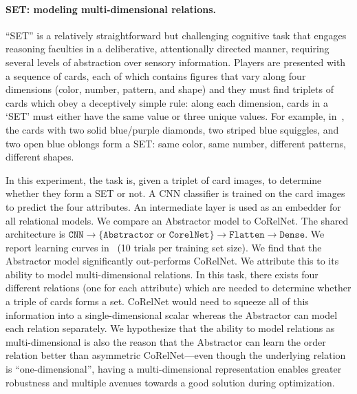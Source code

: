 \paragraph{SET: modeling multi-dimensional relations.}
``SET'' is a relatively straightforward but challenging cognitive task that engages reasoning faculties in a deliberative, attentionally directed manner, requiring several levels of abstraction over sensory information. Players are presented with a sequence of cards, each of which contains figures that vary along four dimensions (color, number, pattern, and shape) and they must find triplets of cards which obey a deceptively simple rule: along each dimension, cards in a `SET' must either have the same value or three unique values. For example, in~, the cards with two solid blue/purple diamonds, two striped blue squiggles, and two open blue oblongs form a SET: same color, same number, different patterns, different shapes.

In this experiment, the task is, given a triplet of card images, to determine whether they form a SET or not. A CNN classifier is trained on the card images to predict the four attributes. An intermediate layer is used as an embedder for all relational models. We compare an Abstractor model to CoRelNet. The shared architecture is $\texttt{CNN} \to \{\texttt{Abstractor} \text{ or } \texttt{CorelNet}\} \to \texttt{Flatten} \to \texttt{Dense}$. We report learning curves in~ (10 trials per training set size). We find that the Abstractor model significantly out-performs CoRelNet. We attribute this to its ability to model multi-dimensional relations. In this task, there exists four different relations (one for each attribute) which are needed to determine whether a triple of cards forms a set. CoRelNet would need to squeeze all of this information into a single-dimensional scalar whereas the Abstractor can model each relation separately. We hypothesize that the ability to model relations as multi-dimensional is also the reason that the Abstractor can learn the order relation better than asymmetric CoRelNet---even though the underlying relation is ``one-dimensional'', having a multi-dimensional representation enables greater robustness and multiple avenues towards a good solution during optimization.

